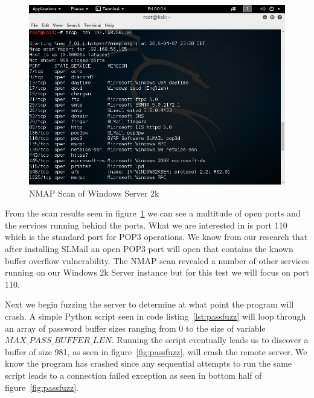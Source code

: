\documentclass[12pt]{article}
\begin{document}
\begin{figure}[ht]
    \centering
    \includegraphics[width=5.5in]{images/20160407_nmap_scan.png}
    \caption{NMAP Scan of Windows Server 2k}
    \label{fig:nmapwindows}
\end{figure}

From the scan results seen in figure~\ref{fig:nmapwindows} we can see a
multitude of open ports and the services running behind the ports. What we are
interested in is port 110 which is the standard port for POP3 operations. We
know from our research that after installing SLMail an open POP3 port will
open that contains the known buffer overflow vulnerability. The NMAP scan 
revealed a number of other services running on our Windows 2k Server instance 
but for this test we will focus on port 110. 

Next we begin fuzzing the server to determine at what point the program 
will crash. A simple Python script seen in code listing~\ref{lst:passfuzz}
will loop through an array of password buffer sizes ranging from 0 to
the size of variable $MAX\_PASS\_BUFFER\_LEN$. Running the script eventually
leads us to discover a buffer of size 981, as seen in 
figure~\ref{fig:passfuzz}, will crash the remote server. We know the program
has crashed since any sequential attempts to run the same script leads to 
a connection failed exception as seen in bottom half of 
figure~\ref{fig:passfuzz}.
\end{document}
